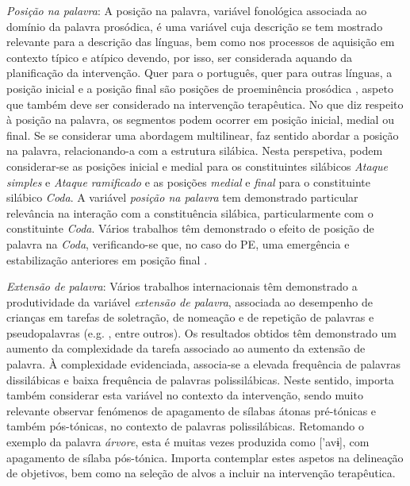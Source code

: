 \documentclass[output=paper,colorlinks,citecolor=brown,booklanguage=portuguese]{langscibook}
\begin{document}
\emph{Posição na palavra}: A posição na palavra, variável fonológica associada ao domínio da palavra prosódica, é uma variável cuja descrição se tem mostrado relevante para a descrição das línguas, bem como nos processos de aquisição em contexto típico \citep{Freitas1997} e atípico \citep{Lousada2012, Ramalho2017, Ramalho2018} devendo, por isso, ser considerada aquando da planificação da intervenção. Quer para o português, quer para outras línguas, a posição inicial e a posição final são posições de proeminência prosódica \citep{Vigario2003}, aspeto que também deve ser considerado na intervenção terapêutica. No que diz respeito à posição na palavra, os segmentos podem ocorrer em posição inicial, medial ou final. Se se considerar uma abordagem multilinear, faz sentido abordar a posição na palavra, relacionando-a com a estrutura silábica. Nesta perspetiva, podem considerar-se as posições inicial e medial para os constituintes silábicos \emph{Ataque simples} e \emph{Ataque ramificado} e as posições \emph{medial} e \emph{final} para o constituinte silábico \emph{Coda}. A variável \emph{posição na palavra} tem demonstrado particular relevância na interação com a constituência silábica, particularmente com o constituinte \emph{Coda}. Vários trabalhos têm demonstrado o efeito de posição de palavra na \emph{Coda}, verifican\-do-se que, no caso do PE, uma emergência e estabilização anteriores em posição final \citep{Freitas1997, Amorim2014}.

\emph{Extensão de palavra}: Vários trabalhos internacionais têm demonstrado a produtividade da variável \emph{extensão de palavra}, associada ao desempenho de crianças em tarefas de soletração, de nomeação e de repetição de palavras e pseudopalavras (e.g. \citealp{James2006, Lee2007, Mason2015, Masso2017}, entre outros). Os resultados obtidos têm demonstrado um aumento da complexidade da tarefa associado ao aumento da extensão de palavra. À comple\-xidade evidenciada, associa-se a elevada frequência de palavras dissilábicas e baixa frequência de palavras polissilábicas.  Neste sentido, importa também considerar esta variável no contexto da intervenção, sendo muito relevante observar fenómenos de apagamento de sílabas átonas pré-tónicas e também pós-tónicas, no contexto de palavras polissilábicas. Retomando o exemplo da palavra \emph{árvore}, esta é muitas vezes produzida como ['avɨ], com apagamento de sílaba pós-tónica. Importa contemplar estes aspetos na delineação de objetivos, bem como na seleção de alvos a incluir na intervenção terapêutica.
\end{document}
